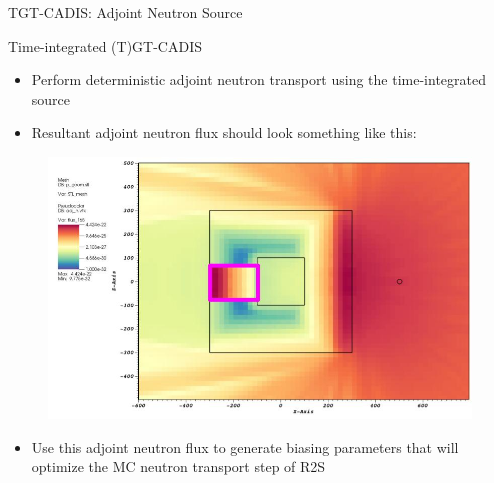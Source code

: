 \documentclass{beamer}
\begin{document}
\begin{frame}{TGT-CADIS: Adjoint Neutron Source}
\end{frame}


\begin{frame}{Time-integrated (T)GT-CADIS}
	\begin{itemize}
		\item{Perform deterministic adjoint neutron transport using the
			time-integrated source}
		\item{Resultant adjoint neutron flux should look something like
			this:}
	\end{itemize}
        \begin{figure}
	\centering
	\includegraphics[scale=0.20]{tgt_adj_n.jpg}
	\end{figure}
	\begin{itemize}
		\item{Use this adjoint neutron flux to generate biasing
			parameters that will optimize the MC neutron transport
			step of R2S}
	\end{itemize}
\end{frame}
\end{document}
